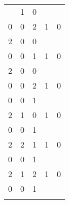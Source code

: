 \documentclass[11pt]{article} \usepackage{amssymb}
\begin{document}
\begin{enumerate}
\begin{enumerate}
\begin{tabular}{l|l|l|l|l}
\begin{pmatrix}
            1&1  &0 \\ 
            0&0  &2 
          \end{pmatrix}$
          & $(x^2+2x+2)(x+1)$ & 8 & 702&16\\
        \end{tabular}
        \begin{tabular}{l|l|l|l|l}
        Representative& Characteristic Polynomial& Element Order& Class Size& Centraliser Size\\
        \hline
          $\begin{pmatrix}
            0&1  &0 \\ 
            2&0  &0 \\ 
            0&0  &1 
          \end{pmatrix}$
          & $(x^2+1)(x+2)$ & 4 & 702&16\\
        \hline
          $\begin{pmatrix}
            0&1  &0 \\ 
            2&0  &0 \\ 
            0&0  &2 
          \end{pmatrix}$
          & $(x^2+1)(x+1)$ & 4 & 702&16\\
        \hline
          $\begin{pmatrix}
            0&1  &0 \\ 
            0&0  &1 \\ 
            2&1  &0 
          \end{pmatrix}$
          & $x^3+2x+1$ & 26 & 432&26\\
        \hline
          $\begin{pmatrix}
            0&1  &0 \\ 
            0&0  &1 \\ 
            2&2  &1 
          \end{pmatrix}$
          & $x^3+2x^2+x+1$ & 26 & 432&26\\
        \hline
          $\begin{pmatrix}
            0&1  &0 \\ 
            0&0  &1 \\ 
            2&1  &2 
          \end{pmatrix}$
          & $x^3+x^2+2x+1$ & 26 & 432&26\\
        \hline
          $\begin{pmatrix}
            0&1  &0 \\ 
            0&0  &1 \\ 

\end{pmatrix}
\end{tabular}
\end{enumerate}
\end{enumerate}
\end{document}
